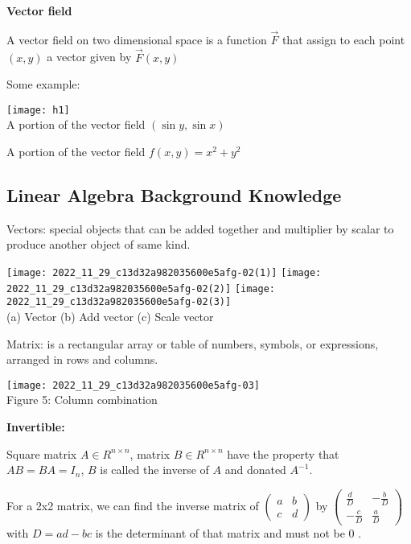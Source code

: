 \documentclass[a4paper]{article}
\begin{document}
\textbf{Vector field}

A vector field on two dimensional space is a function $\vec{F}$ that assign to each point $(x, y)$ a vector given by $\vec{F}(x, y)$

Some example:


\begin{center}
	\texttt{[image: h1]}\\
	A portion of the vector field $(\sin y, \sin x)$ \quad
	
        A portion of the vector field $f(x, y)=x^{2}+y^{2}$
\end{center}



	\subsection{Linear Algebra Background Knowledge}


\enskip \enskip \enskip Vectors: special objects that can be added together and multiplier by scalar to produce another object of same kind.

\begin{center}
	\texttt{[image: 2022\_11\_29\_c13d32a982035600e5afg-02(1)]}
	\texttt{[image: 2022\_11\_29\_c13d32a982035600e5afg-02(2)]}
	\texttt{[image: 2022\_11\_29\_c13d32a982035600e5afg-02(3)]}\\
	(a) Vector (b) Add vector  (c) Scale vector
\end{center}




Matrix: is a rectangular array or table of numbers, symbols, or expressions, arranged in rows and columns.

\begin{center}
	\texttt{[image: 2022\_11\_29\_c13d32a982035600e5afg-03]}\\
	   Figure 5: Column combination
\end{center}


\textbf{Invertible:}

Square matrix $A \in R^{n \times n}$, matrix $B \in R^{n \times n}$ have the property that $A B=B A=I_{n}$, $B$ is called the inverse of $A$ and donated $A^{-1}$.

For a 2x2 matrix, we can find the inverse matrix of $\left(\begin{array}{ll}a & b \\ c & d\end{array}\right)$ by $\left(\begin{array}{cc}\frac{d}{D} & -\frac{b}{D} \\ -\frac{c}{D} & \frac{a}{D}\end{array}\right)$ with $D=a d-b c$ is the determinant of that matrix and must not be 0 .
\end{document}
